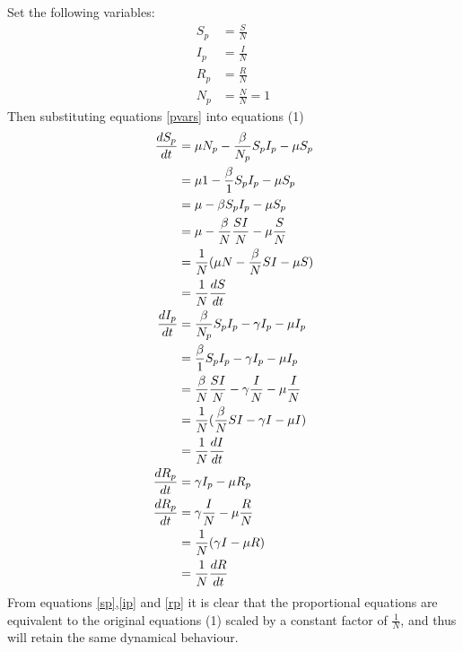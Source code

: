 Set the following variables:
\begin{subequations}\label{pvars}
\begin{align}
    S_p &= \frac{S}{N}\\
    I_p &= \frac{I}{N}\\
    R_p &= \frac{R}{N}\\
    N_p &= \frac{N}{N} = 1
\end{align}
\end{subequations}
Then substituting equations \ref{pvars} into equations (1)
\begin{align}
  \frac{dS_p}{dt} &= \mu N_p -\frac{\beta}{N_p} S_p I_p - \mu S_p\nonumber\\
                  &= \mu 1 -\frac{\beta}{1} S_p I_p - \mu S_p\nonumber\\
                  &= \mu -\beta S_p I_p - \mu S_p\nonumber\\
                  &= \mu -\frac{\beta}{N} \frac{S I}{N} - \mu \frac{S}{N}\nonumber\\
                  &= \frac{1}{N}(\mu N -\frac{\beta}{N} SI - \mu S)\nonumber\\
                  &= \frac{1}{N} \frac{dS}{dt}\label{sp}\\
  \vspace{8pt}
  \frac{dI_p}{dt} &= \frac{\beta}{N_p} S_p I_p - \gamma I_p - \mu I_p\nonumber\\
                  &= \frac{\beta}{1} S_p I_p - \gamma I_p - \mu I_p\nonumber\\
                  &= \frac{\beta}{N} \frac{S I}{N} - \gamma \frac{I}{N} - \mu \frac{I}{N}\nonumber\\
                  &= \frac{1}{N} (\frac{\beta}{N} SI - \gamma I - \mu I)\nonumber\\
                  &= \frac{1}{N} \frac{dI}{dt}\label{ip}\\
  \vspace{8pt}
  \frac{dR_p}{dt} &= \gamma I_p - \mu R_p\nonumber\\
  \frac{dR_p}{dt} &= \gamma \frac{I}{N} - \mu \frac{R}{N}\nonumber\\
                  &= \frac{1}{N} (\gamma I - \mu R)\nonumber\\
                  &= \frac{1}{N} \frac{dR}{dt}\label{rp}
\end{align}
From equations \ref{sp},\ref{ip} and \ref{rp} it is clear that the proportional equations are equivalent to the original equations (1) scaled by a constant factor of $\frac{1}{N}$, and thus will retain the same dynamical behaviour.
